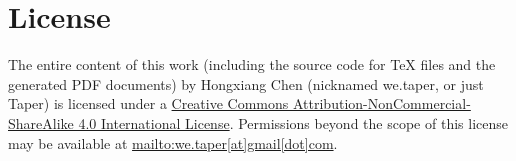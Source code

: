 \documentclass{article}
\begin{document}
\begin{thebibliography}{1}
\end{thebibliography}
\printnomenclature
\section{License}
The entire content of this work (including the source code
for TeX files and the generated PDF documents) by 
Hongxiang Chen (nicknamed we.taper, or just Taper) is
licensed under a 
\href{http://creativecommons.org/licenses/by-nc-sa/4.0/}{Creative 
Commons Attribution-NonCommercial-ShareAlike 4.0 International 
License}. Permissions beyond the scope of this 
license may be available at \url{mailto:we.taper[at]gmail[dot]com}.
\end{document}
